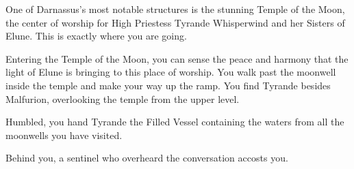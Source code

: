 One of Darnassus’s most notable structures is the stunning Temple of the Moon, the center of worship for High Priestess Tyrande Whisperwind and her Sisters of Elune. This is exactly where you are going.

Entering the Temple of the Moon, you can sense the peace and harmony that the light of Elune is bringing to this place of worship. You walk past the moonwell inside the temple and make your way up the ramp. You find Tyrande besides Malfurion, overlooking the temple from the upper level.


Humbled, you hand Tyrande the Filled Vessel containing the waters from all the moonwells you have visited.


Behind you, a sentinel who overheard the conversation accosts you.


